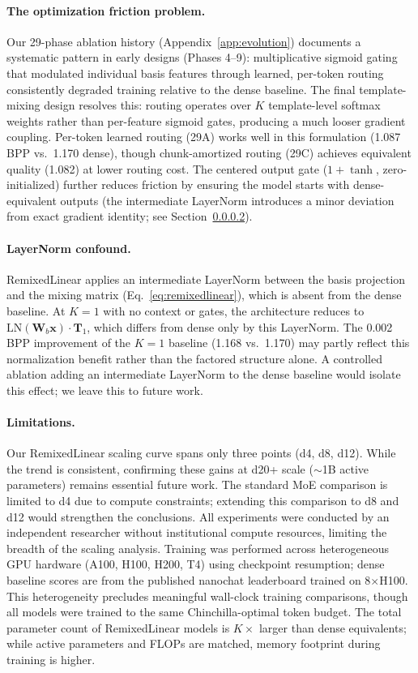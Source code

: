 \documentclass[11pt]{article}
\begin{document}
\paragraph{The optimization friction problem.}
Our 29-phase ablation history (Appendix~\ref{app:evolution}) documents a systematic pattern in early designs (Phases 4--9): multiplicative sigmoid gating that modulated individual basis features through learned, per-token routing consistently degraded training relative to the dense baseline. The final template-mixing design resolves this: routing operates over $K$ template-level softmax weights rather than per-feature sigmoid gates, producing a much looser gradient coupling. Per-token learned routing (29A) works well in this formulation (1.087 BPP vs.\ 1.170 dense), though chunk-amortized routing (29C) achieves equivalent quality (1.082) at lower routing cost. The centered output gate ($1 + \tanh$, zero-initialized) further reduces friction by ensuring the model starts with dense-equivalent outputs (the intermediate LayerNorm introduces a minor deviation from exact gradient identity; see Section~\ref{sec:ln_confound}).

\paragraph{LayerNorm confound.}
\label{sec:ln_confound}
RemixedLinear applies an intermediate LayerNorm between the basis projection and the mixing matrix (Eq.~\ref{eq:remixedlinear}), which is absent from the dense baseline. At $K{=}1$ with no context or gates, the architecture reduces to $\text{LN}(\mathbf{W}_b \mathbf{x}) \cdot \mathbf{T}_1$, which differs from dense only by this LayerNorm. The 0.002 BPP improvement of the $K{=}1$ baseline (1.168 vs.\ 1.170) may partly reflect this normalization benefit rather than the factored structure alone. A controlled ablation adding an intermediate LayerNorm to the dense baseline would isolate this effect; we leave this to future work.

\paragraph{Limitations.}
Our RemixedLinear scaling curve spans only three points (d4, d8, d12). While the trend is consistent, confirming these gains at d20+ scale ($\sim$1B active parameters) remains essential future work. The standard MoE comparison is limited to d4 due to compute constraints; extending this comparison to d8 and d12 would strengthen the conclusions. All experiments were conducted by an independent researcher without institutional compute resources, limiting the breadth of the scaling analysis. Training was performed across heterogeneous GPU hardware (A100, H100, H200, T4) using checkpoint resumption; dense baseline scores are from the published nanochat leaderboard \citep{karpathy2025nanochat} trained on 8$\times$H100. This heterogeneity precludes meaningful wall-clock training comparisons, though all models were trained to the same Chinchilla-optimal token budget. The total parameter count of RemixedLinear models is $K\times$ larger than dense equivalents; while active parameters and FLOPs are matched, memory footprint during training is higher.
\end{document}
